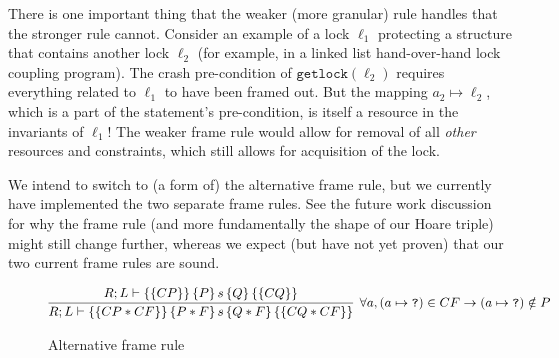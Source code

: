 There is one important thing that the weaker (more granular) rule handles that
the stronger rule cannot. Consider an example of a lock $\ell_1$ protecting a
structure that contains another lock $\ell_2$ (for example, in a linked list
hand-over-hand lock coupling program). The crash pre-condition of
$\texttt{getlock}(\ell_2)$ requires everything related to $\ell_1$ to have been
framed out. But the mapping $a_2\mapsto\ell_2$, which is a part of the
statement's pre-condition, is itself a resource in the invariants of $\ell_1$!
The weaker frame rule would allow for removal of all \textit{other} resources
and constraints, which still allows for acquisition of the lock.

We intend to switch to (a form of) the alternative frame rule, but we currently
have implemented the two separate frame rules. See the future work discussion
for why the frame rule (and more fundamentally the shape of our Hoare triple)
might still change further, whereas we expect (but have not yet proven) that
our two current frame rules are sound.

\begin{figure*}
\begin{gather*}
    \infer[\forall a, (a \mapsto\texttt{?}) \in CF \imp
    (a\mapsto\texttt{?}) \notin P]
	{\hoarestmt{R}{L}{CP * CF}{P * F}{s}{Q * F}{CQ * CF}}
	{\hoarestmt{R}{L}{CP}{P}{s}{Q}{CQ}}
\end{gather*}
\caption{Alternative frame rule}
\label{fig:altframe}
\end{figure*}

%

